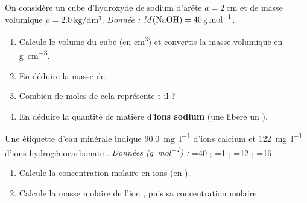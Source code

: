 \documentclass[11pt,a4paper]{article}
\newcommand{\gmol}{\si{\gram\per\mole}}
\begin{document}
\begin{exo}
On considère un cube d'hydroxyde de sodium  d'arête $a=\SI{2}{\centi\meter}$ et de masse
volumique $\rho=\SI{2,0}{\kilo\gram\per\deci\meter\cubed}$. \emph{Donnée :}
$M(\ce{NaOH})=\SI{40}{\gram\per\mole}$.
\begin{enumerate}[label=\textbf{\alph*)},leftmargin=2em,topsep=1pt,itemsep=1.5pt]
  \item Calcule le volume du cube (en \si{\centi\meter\cubed}) et convertis la masse volumique en
        \si{\gram\per\centi\meter\cubed}.
  \item En déduire la masse de .
  \item Combien de moles de  cela représente-t-il ?
  \item En déduire la quantité de matière d'\textbf{ions sodium}  (une  libère un ).
\end{enumerate}
\end{exo}

\begin{exo}
Une étiquette d'eau minérale indique \SI{90,0}{\milli\gram\per\litre} d'ions calcium  et
\SI{122}{\milli\gram\per\litre} d'ions hydrogénocarbonate . \emph{Données (\gmol) :}
=40 ; =1 ; =12 ; =16.
\begin{enumerate}[label=\textbf{\alph*)},leftmargin=2em,topsep=1pt,itemsep=1.5pt]
  \item Calcule la concentration molaire en ions  (en \si{\Molar}).
  \item Calcule la masse molaire de l'ion , puis sa concentration molaire.
\end{enumerate}
\end{exo}
\end{document}
